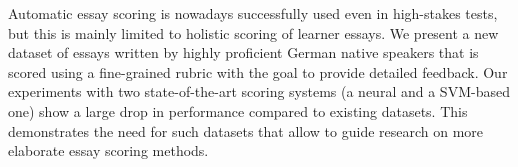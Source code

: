 Automatic essay scoring is nowadays successfully used even in high-stakes tests, but this is mainly limited to holistic scoring of learner essays. We present a new dataset of essays written by highly proficient German native speakers that is scored using a fine-grained rubric with the goal to provide detailed feedback. Our experiments with two state-of-the-art scoring systems (a neural and a SVM-based one)                                show a large drop in performance compared to existing datasets. This demonstrates the need for such datasets that allow to guide research on more elaborate essay scoring methods.
